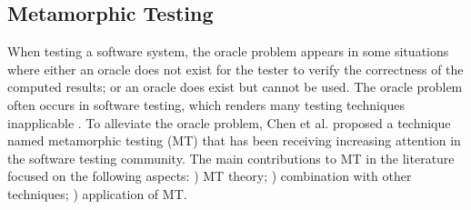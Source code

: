 \documentclass[conference]{IEEEtran}
\theoremstyle{remark}
\newcommand{\rmnum}[1]{\expandafter{\romannumeral #1\relax}}
\begin{document}
\subsection{Metamorphic Testing}
When testing a software system, the oracle problem appears in some situations where either an oracle does not exist for the tester to verify the correctness of the computed results; or an oracle does exist but cannot be used. The oracle problem often occurs in software testing, which renders many testing techniques inapplicable \cite{barr2015oracle}. To alleviate the oracle problem, Chen et al. \cite{chen1998metamorphic} proposed a technique named metamorphic testing (MT) that has been receiving increasing attention in the software testing community\cite{barr2015oracle, segura2016survey, chen2018metamorphic}. The main contributions to MT in the literature focused on the following aspects: \rmnum{1}) MT theory; \rmnum{2}) combination with other techniques; \rmnum{3}) application of MT.
\end{document}
